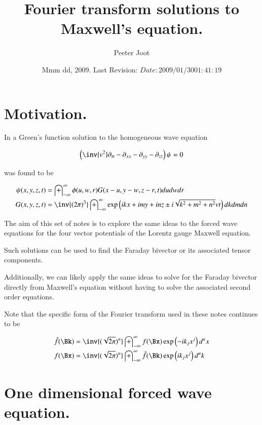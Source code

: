\documentclass{article}
\title{ Fourier transform solutions to Maxwell's equation. }
\author{Peeter Joot}
\date{ Mmm dd, 2009.  Last Revision: $Date: 2009/01/30 01:41:19 $ }
\newcommand{\IIinf}[0]{ \int_{-\infty}^\infty }
\begin{document}
\maketitle{}

\tableofcontents
\section{ Motivation. }

In \cite{PJwaveFourier} a Green's function solution to the homogeneous 
wave equation

\begin{align}\label{eqn:wave}
\left(\inv{v^2} \partial_{tt} -\partial_{xx} -\partial_{yy} -\partial_{zz} \right)\psi = 0 
\end{align}

was found to be

\begin{align}\label{eqn:greensSolution3d}
{\psi}(x,y,z,t) &= \IIinf \phi(u,w,r) G( x-u, y-w, z-r, t) du dw dr \\
G(x,y,z,t) &= \inv{({2\pi})^3} \IIinf \exp\left( i k x + i m y + i n z \pm i \sqrt{k^2 + m^2 + n^2} v t \right) dk dm dn
\end{align}

The aim of this set of notes is to explore the same ideas to the forced wave
equations for the four vector potentials of the Lorentz gauge Maxwell equation.

Such solutions can be used to find the Faraday bivector or its associated
tensor components.

Additionally, we can likely apply the same ideas to solve for the Faraday
bivector directly from Maxwell's equation without having to solve the 
associated second order equations.

Note that the specific form of the Fourier transform used in these notes continues to be

\begin{align}
\hat{f}(\Bk) &= \inv{(\sqrt{2\pi})^n} \IIinf f(\Bx) \exp\left( -i k_j x^j \right) d^n x \\
{f}(\Bx) &= \inv{(\sqrt{2\pi})^n} \IIinf \hat{f}(\Bk) \exp\left( i k_j x^j \right) d^n k
\end{align}

\section{ One dimensional forced wave equation. }
\end{document}
